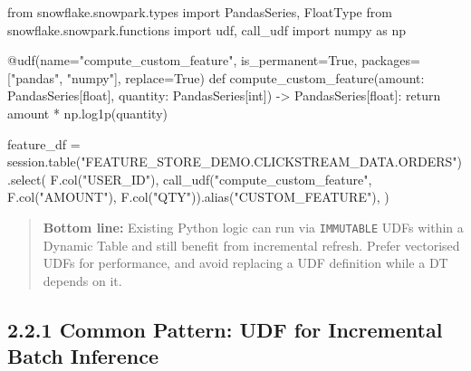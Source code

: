 \documentclass[
  letterpaper,
  DIV=11,
  numbers=noendperiod]{scrreprt}
\newenvironment{Shaded}{\begin{snugshade}}{\end{snugshade}}
\newcommand{\AttributeTok}[1]{\textcolor[rgb]{0.40,0.45,0.13}{#1}}
\newcommand{\BuiltInTok}[1]{\textcolor[rgb]{0.00,0.23,0.31}{#1}}
\newcommand{\ControlFlowTok}[1]{\textcolor[rgb]{0.00,0.23,0.31}{#1}}
\newcommand{\ImportTok}[1]{\textcolor[rgb]{0.00,0.46,0.62}{#1}}
\newcommand{\KeywordTok}[1]{\textcolor[rgb]{0.00,0.23,0.31}{#1}}
\newcommand{\NormalTok}[1]{\textcolor[rgb]{0.00,0.23,0.31}{#1}}
\newcommand{\OperatorTok}[1]{\textcolor[rgb]{0.37,0.37,0.37}{#1}}
\newcommand{\StringTok}[1]{\textcolor[rgb]{0.13,0.47,0.30}{#1}}
\newcommand{\VariableTok}[1]{\textcolor[rgb]{0.07,0.07,0.07}{#1}}
\begin{document}
\begin{Shaded}
\begin{Highlighting}[]
\ImportTok{from}\NormalTok{ snowflake.snowpark.types }\ImportTok{import}\NormalTok{ PandasSeries, FloatType}
\ImportTok{from}\NormalTok{ snowflake.snowpark.functions }\ImportTok{import}\NormalTok{ udf, call\_udf}
\ImportTok{import}\NormalTok{ numpy }\ImportTok{as}\NormalTok{ np}

\AttributeTok{@udf}\NormalTok{(name}\OperatorTok{=}\StringTok{"compute\_custom\_feature"}\NormalTok{, is\_permanent}\OperatorTok{=}\VariableTok{True}\NormalTok{,}
\NormalTok{     packages}\OperatorTok{=}\NormalTok{[}\StringTok{"pandas"}\NormalTok{, }\StringTok{"numpy"}\NormalTok{], replace}\OperatorTok{=}\VariableTok{True}\NormalTok{)}
\KeywordTok{def}\NormalTok{ compute\_custom\_feature(amount: PandasSeries[}\BuiltInTok{float}\NormalTok{],}
\NormalTok{                           quantity: PandasSeries[}\BuiltInTok{int}\NormalTok{]) }\OperatorTok{{-}\textgreater{}}\NormalTok{ PandasSeries[}\BuiltInTok{float}\NormalTok{]:}
    \ControlFlowTok{return}\NormalTok{ amount }\OperatorTok{*}\NormalTok{ np.log1p(quantity)}

\NormalTok{feature\_df }\OperatorTok{=}\NormalTok{ session.table(}\StringTok{"FEATURE\_STORE\_DEMO.CLICKSTREAM\_DATA.ORDERS"}\NormalTok{).select(}
\NormalTok{    F.col(}\StringTok{"USER\_ID"}\NormalTok{),}
\NormalTok{    call\_udf(}\StringTok{"compute\_custom\_feature"}\NormalTok{,}
\NormalTok{             F.col(}\StringTok{"AMOUNT"}\NormalTok{), F.col(}\StringTok{"QTY"}\NormalTok{)).alias(}\StringTok{"CUSTOM\_FEATURE"}\NormalTok{),}
\NormalTok{)}
\end{Highlighting}
\end{Shaded}

\begin{quote}
\textbf{Bottom line:} Existing Python logic can run via
\texttt{IMMUTABLE} UDFs within a Dynamic Table and still benefit from
incremental refresh. Prefer vectorised UDFs for performance, and avoid
replacing a UDF definition while a DT depends on it.
\end{quote}

\hypertarget{common-pattern-udf-for-incremental-batch-inference}{%
\subsection{2.2.1 Common Pattern: UDF for Incremental Batch
Inference}\label{common-pattern-udf-for-incremental-batch-inference}}
\end{document}
